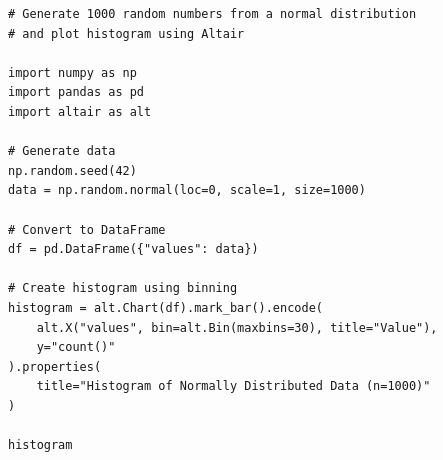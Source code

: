 \begin{verbatim}
# Generate 1000 random numbers from a normal distribution
# and plot histogram using Altair

import numpy as np
import pandas as pd
import altair as alt

# Generate data
np.random.seed(42)
data = np.random.normal(loc=0, scale=1, size=1000)

# Convert to DataFrame
df = pd.DataFrame({"values": data})

# Create histogram using binning
histogram = alt.Chart(df).mark_bar().encode(
    alt.X("values", bin=alt.Bin(maxbins=30), title="Value"),
    y="count()"
).properties(
    title="Histogram of Normally Distributed Data (n=1000)"
)

histogram
\end{verbatim}